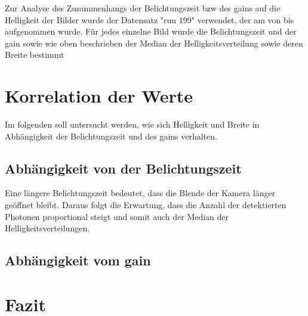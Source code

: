 Zur Analyse des Zusammenhangs der Belichtungszeit bzw des gains auf die Helligkeit der Bilder wurde der Datensatz "run 199" verwendet, der am von bis aufgenommen wurde. Für jedes einzelne Bild wurde die Belichtungszeit und der gain sowie wie oben beschrieben der Median der Helligkeitsverteilung sowie deren Breite bestimmt

\section{Korrelation der Werte}
Im folgenden soll untersucht werden, wie sich Helligkeit und Breite in Abhängigkeit der Belichtungszeit und des gains verhalten.

\subsection{Abhängigkeit von der Belichtungszeit}
Eine längere Belichtungszeit bedeutet, dass die Blende der Kamera länger geöffnet bleibt. Daraus folgt die Erwartung, dass die Anzahl der detektierten Photonen proportional steigt und somit auch der Median der Helligkeitsverteilungen.

\subsection{Abhängigkeit vom gain}

\section{Fazit}